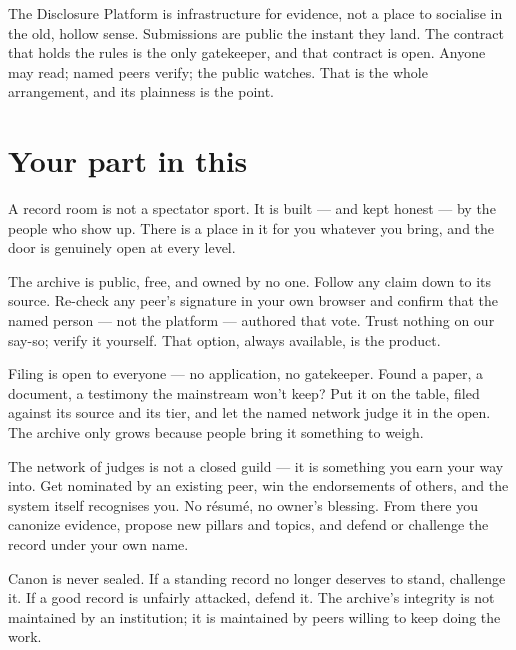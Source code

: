 \documentclass[11pt,a4paper]{article}
\begin{document}
\vspace{0.5em}

The Disclosure Platform is infrastructure for evidence, not a place to
socialise in the old, hollow sense. Submissions are public the instant they
land. The contract that holds the rules is the only gatekeeper, and that
contract is open. Anyone may read; named peers verify; the public watches.
That is the whole arrangement, and its plainness is the point.

\section{Your part in this}

A record room is not a spectator sport. It is built --- and kept honest ---
by the people who show up. There is a place in it for you whatever you bring,
and the door is genuinely open at every level.

\begin{description}[leftmargin=1.2em,style=nextline]
  \item[\textnormal{\textbf{Read it.}}]
  The archive is public, free, and owned by no one. Follow any claim down to
  its source. Re-check any peer's signature in your own browser and confirm
  that the named person --- not the platform --- authored that vote. Trust
  nothing on our say-so; verify it yourself. That option, always available,
  is the product.

  \item[\textnormal{\textbf{File evidence.}}]
  Filing is open to everyone --- no application, no gatekeeper. Found a paper,
  a document, a testimony the mainstream won't keep? Put it on the table,
  filed against its source and its tier, and let the named network judge it
  in the open. The archive only grows because people bring it something to
  weigh.

  \item[\textnormal{\textbf{Become a peer.}}]
  The network of judges is not a closed guild --- it is something you earn
  your way into. Get nominated by an existing peer, win the endorsements of
  others, and the system itself recognises you. No résumé, no owner's
  blessing. From there you canonize evidence, propose new pillars and topics,
  and defend or challenge the record under your own name.

  \item[\textnormal{\textbf{Keep it honest.}}]
  Canon is never sealed. If a standing record no longer deserves to stand,
  challenge it. If a good record is unfairly attacked, defend it. The
  archive's integrity is not maintained by an institution; it is maintained
  by peers willing to keep doing the work.
\end{description}
\end{document}
